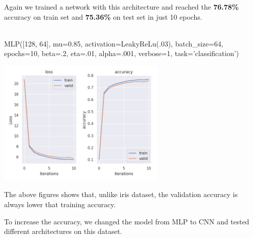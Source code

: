\documentclass[10pt]{SelfArx} %
\begin{document}
	Again we trained a network with this architecture and reached the \textbf{76.78\%} accuracy on train set and \textbf{75.36\%} on test set in just 10 epochs.
	\\
	\\
	\begin{python}
MLP([128, 64], mu=0.85,
activation=LeakyReLu(.03),
batch_size=64, epochs=10, 
beta=.2, eta=.01, alpha=.001,
verbose=1, task='classification')
	\end{python}
	\begin{center}
		\includegraphics[width=\linewidth,height=6cm]{img/fashion-plots2}
		\label{ffashion2}
	\end{center}
	The above figures shows that, unlike iris dataset, the validation accuracy is always lower that training accuracy. 
	
	To increase the accuracy, we changed the model from MLP to CNN and tested different architectures on this dataset.\\
	
\end{document}
